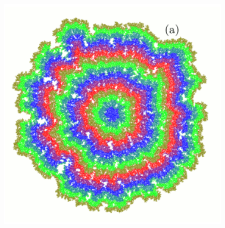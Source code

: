 \documentclass[9pt,table,xcolor=dvipsnames]{beamer}
\begin{document}
\begin{frame}
\begin{center}
\begin{minipage}{0.4\textwidth}
\begin{center}
        \includegraphics[scale=0.3]{figs/Eden-Simulation-a.png}

      \end{center}
    \end{minipage}
  \end{center}

\end{frame}
\end{document}
